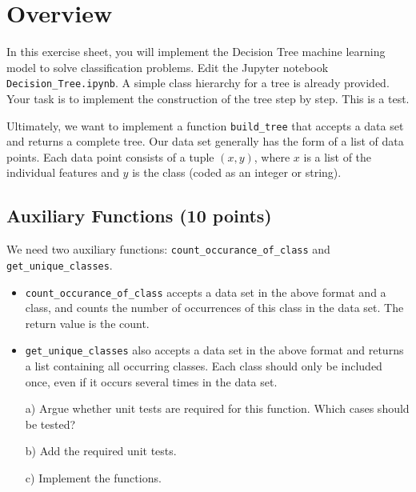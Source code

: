 \documentclass{article}
\begin{document}
\thispagestyle{page1} 

\section{Overview}

In this exercise sheet, you will implement the Decision Tree machine learning model to solve classification problems. 
Edit the Jupyter notebook \texttt{Decision\_Tree.ipynb}. A simple class hierarchy for a tree is already provided.
Your task is to implement the construction of the tree step by step. This is a test.

Ultimately, we want to implement a function \texttt{build\_tree} that accepts a data set and returns a complete tree. 
Our data set generally has the form of a list of data points. Each data point consists of a tuple $(x,y)$, where $x$ is a list of the individual features and $y$ is the class (coded as an integer or string). 

\subsection{Auxiliary Functions (10 points)}

We need two auxiliary functions: \texttt{count\_occurance\_of\_class} and \texttt{get\_unique\_classes}. 

\begin{itemize}
\item \texttt{count\_occurance\_of\_class} accepts a data set in the above format and a class, and counts the number of occurrences of this class in the data set. The return value is the count.
\item \texttt{get\_unique\_classes} also accepts a data set in the above format and returns a list containing all occurring classes. Each class should only be included once, even if it occurs several times in the data set. 
\end{itemize}

\begin{enumerate}

\item[a)] Argue whether unit tests are required for this function. Which cases should be tested?

\item[b)] Add the required unit tests.

\item[c)] Implement the functions.

\end{enumerate}
\end{document}

